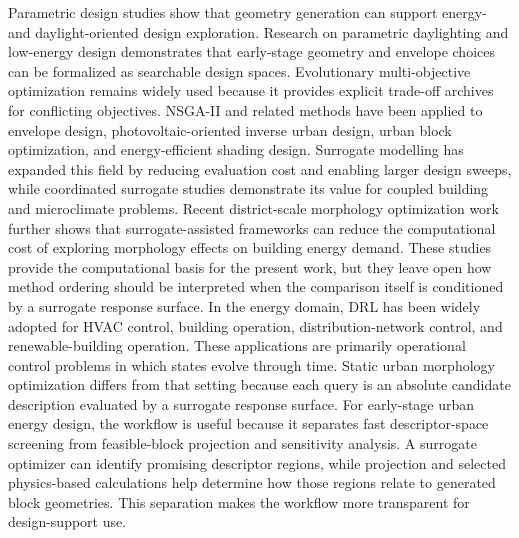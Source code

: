 \documentclass[10pt]{article}
\begin{document}
\begin{revisionbox}
Parametric design studies show that geometry generation can support energy- and daylight-oriented design exploration. Research on parametric daylighting and low-energy design demonstrates that early-stage geometry and envelope choices can be formalized as searchable design spaces. Evolutionary multi-objective optimization remains widely used because it provides explicit trade-off archives for conflicting objectives. NSGA-II and related methods have been applied to envelope design, photovoltaic-oriented inverse urban design, urban block optimization, and energy-efficient shading design.
\revisionseparator
{}
Surrogate modelling has expanded this field by reducing evaluation cost and enabling larger design sweeps, while coordinated surrogate studies demonstrate its value for coupled building and microclimate problems. Recent district-scale morphology optimization work further shows that surrogate-assisted frameworks can reduce the computational cost of exploring morphology effects on building energy demand. These studies provide the computational basis for the present work, but they leave open how method ordering should be interpreted when the comparison itself is conditioned by a surrogate response surface.
\revisionseparator
{}
In the energy domain, DRL has been widely adopted for HVAC control, building operation, distribution-network control, and renewable-building operation. These applications are primarily operational control problems in which states evolve through time. Static urban morphology optimization differs from that setting because each query is an absolute candidate description evaluated by a surrogate response surface.
\revisionseparator
{}
For early-stage urban energy design, the workflow is useful because it separates fast descriptor-space screening from feasible-block projection and sensitivity analysis. A surrogate optimizer can identify promising descriptor regions, while projection and selected physics-based calculations help determine how those regions relate to generated block geometries. This separation makes the workflow more transparent for design-support use.
\end{revisionbox}
\end{document}

